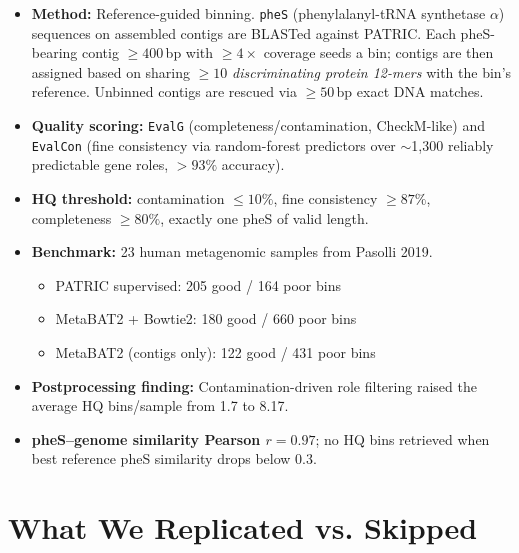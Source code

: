 \documentclass[11pt]{article}
\begin{document}
\begin{itemize}
  \item \textbf{Method:} Reference-guided binning. \texttt{pheS} (phenylalanyl-tRNA
  synthetase $\alpha$) sequences on assembled contigs are BLASTed against PATRIC.
  Each pheS-bearing contig $\geq 400$\,bp with $\geq 4\times$ coverage seeds a bin;
  contigs are then assigned based on sharing $\geq 10$ \emph{discriminating protein
  12-mers} with the bin's reference. Unbinned contigs are rescued via $\geq 50$\,bp
  exact DNA matches.
  \item \textbf{Quality scoring:} \texttt{EvalG} (completeness/contamination,
  CheckM-like) and \texttt{EvalCon} (fine consistency via random-forest predictors
  over $\sim$1{,}300 reliably predictable gene roles, $>93\%$ accuracy).
  \item \textbf{HQ threshold:} contamination $\leq 10\%$, fine consistency $\geq 87\%$,
  completeness $\geq 80\%$, exactly one pheS of valid length.
  \item \textbf{Benchmark:} 23 human metagenomic samples from Pasolli 2019.
  \begin{itemize}
    \item PATRIC supervised: 205 good / 164 poor bins
    \item MetaBAT2 + Bowtie2:  180 good / 660 poor bins
    \item MetaBAT2 (contigs only): 122 good / 431 poor bins
  \end{itemize}
  \item \textbf{Postprocessing finding:} Contamination-driven role filtering
  raised the average HQ bins/sample from 1.7 to 8.17.
  \item \textbf{pheS--genome similarity Pearson $r = 0.97$}; no HQ bins retrieved
  when best reference pheS similarity drops below 0.3.
\end{itemize}

\section{What We Replicated vs. Skipped}
\end{document}
